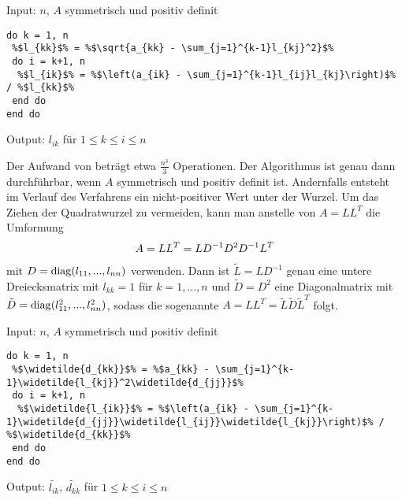 \begin{algorithm}
	Input: $n$, $A$ symmetrisch und positiv definit
	\begin{lstlisting}
do k = 1, n
 %$l_{kk}$% = %$\sqrt{a_{kk} - \sum_{j=1}^{k-1}l_{kj}^2}$%
 do i = k+1, n
  %$l_{ik}$% = %$\left(a_{ik} - \sum_{j=1}^{k-1}l_{ij}l_{kj}\right)$% / %$l_{kk}$%
 end do
end do
	\end{lstlisting}
	Output: $l_{ik}$ für $1\le k\le i\le n$
\end{algorithm}

\begin{remark}
	Der Aufwand von  beträgt etwa $\frac{n^3}{3}$ Operationen. Der Algorithmus ist genau dann durchführbar, wenn $A$ symmetrisch und positiv definit ist. Andernfalls entsteht im Verlauf des Verfahrens ein nicht-positiver Wert unter der Wurzel. Um das Ziehen der Quadratwurzel zu vermeiden, kann man anstelle von $A=LL^T$ die Umformung
	\begin{align}
		A = LL^T = LD^{-1}D^2D^{-1}L^T\notag
	\end{align}
	mit $D = \operatorname{diag}(l_{11},...,l_{nn})$ verwenden. Dann ist $\tilde{L}=LD^{-1}$ genau eine untere Dreiecksmatrix mit $l_{kk}=1$ für $k=1,...,n$ und $\tilde{D}=D^2$ eine Diagonalmatrix mit $\tilde{D}=\operatorname{diag}(l_{11}^2,...,l_{nn}^2)$, sodass die sogenannte  $A=LL^T=\tilde{L}\tilde{D}\tilde{L}^T$ folgt.
\end{remark}

\begin{algorithm}
	Input: $n$, $A$ symmetrisch und positiv definit
	\begin{lstlisting}
do k = 1, n
 %$\widetilde{d_{kk}}$% = %$a_{kk} - \sum_{j=1}^{k-1}\widetilde{l_{kj}}^2\widetilde{d_{jj}}$%
 do i = k+1, n
  %$\widetilde{l_{ik}}$% = %$\left(a_{ik} - \sum_{j=1}^{k-1}\widetilde{d_{jj}}\widetilde{l_{ij}}\widetilde{l_{kj}}\right)$% / %$\widetilde{d_{kk}}$%
 end do
end do
	\end{lstlisting}
	Output: $\widetilde{l_{ik}}$, $\widetilde{d_{kk}}$ für $1\le k\le i\le n$
\end{algorithm}